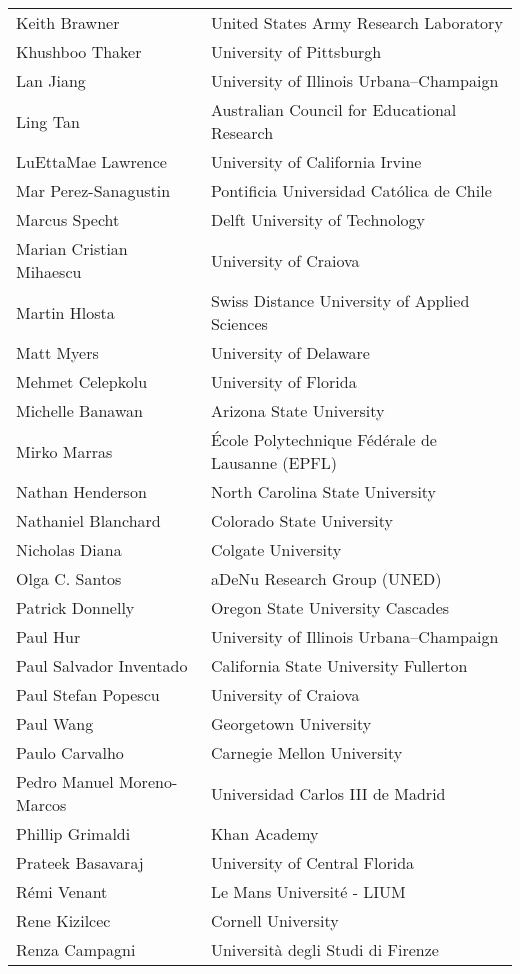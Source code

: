 \documentclass[letterpaper,11pt,oneside]{book} %
\begin{document}
\begin{longtable}[]{@{}
  >{\raggedright\arraybackslash}p{}
  >{\raggedright\arraybackslash}p{}@{}}
Keith Brawner & United States Army Research Laboratory \\
Khushboo Thaker & University of Pittsburgh \\
Lan Jiang & University of Illinois Urbana--Champaign \\
Ling Tan & Australian Council for Educational Research \\
LuEttaMae Lawrence & University of California Irvine \\
Mar Perez-Sanagustin & Pontificia Universidad Católica de Chile \\
Marcus Specht & Delft University of Technology \\
Marian Cristian Mihaescu & University of Craiova \\
Martin Hlosta & Swiss Distance University of Applied Sciences \\
Matt Myers & University of Delaware \\
Mehmet Celepkolu & University of Florida \\
Michelle Banawan & Arizona State University \\
Mirko Marras & École Polytechnique Fédérale de Lausanne (EPFL) \\
Nathan Henderson & North Carolina State University \\
Nathaniel Blanchard & Colorado State University \\
Nicholas Diana & Colgate University \\
Olga C. Santos & aDeNu Research Group (UNED) \\
Patrick Donnelly & Oregon State University Cascades \\
Paul Hur & University of Illinois Urbana--Champaign \\
Paul Salvador Inventado & California State University Fullerton \\
Paul Stefan Popescu & University of Craiova \\
Paul Wang & Georgetown University \\
Paulo Carvalho & Carnegie Mellon University \\
Pedro Manuel Moreno-Marcos & Universidad Carlos III de Madrid \\
Phillip Grimaldi & Khan Academy \\
Prateek Basavaraj & University of Central Florida \\
Rémi Venant & Le Mans Université - LIUM \\
Rene Kizilcec & Cornell University \\
Renza Campagni & Università degli Studi di Firenze \\

\end{longtable}
\end{document}
